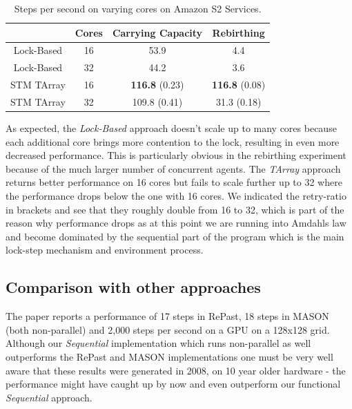 \begin{table}
	\centering
  	\begin{tabular}{ c || c | c | c }
                   & Cores & Carrying Capacity & Rebirthing  \\ \hline \hline 
    	Lock-Based & 16    & 53.9              & 4.4         \\ \hline
    	Lock-Based & 32    & 44.2              & 3.6         \\ \hline \hline 
   		
   		STM TArray & 16    & \textbf{116.8} (0.23)      & \textbf{116.8} (0.08) \\ \hline
   		STM TArray & 32    & 109.8 (0.41)      & 31.3 (0.18) \\ \hline \hline 
   	\end{tabular}
  	
  	\caption{Steps per second on varying cores on Amazon S2 Services.}
	\label{tab:sug_varying_cores_amazon}
\end{table}

As expected, the \textit{Lock-Based} approach doesn't scale up to many cores because each additional core brings more contention to the lock, resulting in even more decreased performance. This is particularly obvious in the rebirthing experiment because of the much larger number of concurrent agents. The \textit{TArray} approach returns better performance on 16 cores but fails to scale further up to 32 where the performance drops below the one with 16 cores. We indicated the retry-ratio in brackets and see that they roughly double from 16 to 32, which is part of the reason why performance drops as at this point we are running into Amdahls law and become dominated by the sequential part of the program which is the main lock-step mechanism and environment process. 
%
%

\subsection{Comparison with other approaches}
The paper \cite{lysenko_framework_2008} reports a performance of 17 steps in RePast, 18 steps in MASON (both non-parallel) and 2,000 steps per second on a GPU on a 128x128 grid. Although our \textit{Sequential} implementation which runs non-parallel as well outperforms the RePast and MASON implementations one must be very well aware that these results were generated in 2008, on 10 year older hardware - the performance might have caught up by now and even outperform our functional \textit{Sequential} approach. 

